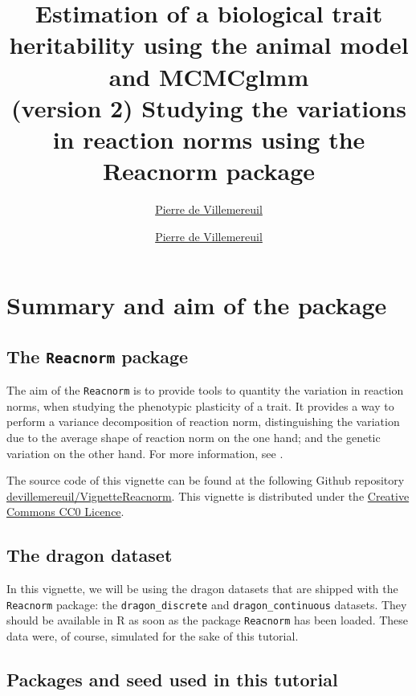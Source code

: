 \documentclass[a4paper,12pt,twoside]{article}
\title{
  \tcbox[colback=themecolor,colframe=themecolor]{\color{white}Tutorial} 
  Estimation of a biological trait heritability using the animal model and MCMCglmm\\
  \large{(version 2)}
}
\author[Pierre de Villemereuil]{\href{mailto:pierre.de-villemereuil@mnhn.fr}{Pierre de Villemereuil}}
\author{\href{mailto:pierre.de-villemereuil@mnhn.fr}{Pierre de Villemereuil}}
\title{Studying the variations in reaction norms using the Reacnorm package}
\begin{document}
\maketitle

\tableofcontents

\newpage

\section{Summary and aim of the package}

\subsection{The \texttt{Reacnorm} package}

The aim of the \texttt{Reacnorm} is to provide tools to quantity the variation in reaction norms, when studying the phenotypic plasticity of a trait. It provides a way to perform a variance decomposition of reaction norm, distinguishing the variation due to the average shape of reaction norm on the one hand; and the genetic variation on the other hand. For more information, see \textcite{devillemereuil_partitioning_2025}.

The source code of this vignette can be found at the following Github repository \href{https://github.com/devillemereuil/VignetteReacnorm}{devillemereuil/VignetteReacnorm}. This vignette is distributed under the \href{https://creativecommons.org/publicdomain/zero/1.0/deed.en}{Creative Commons CC0 Licence}.

\subsection{The dragon dataset}

In this vignette, we will be using the dragon datasets that are shipped with the \texttt{Reacnorm} package: the \texttt{dragon\_discrete} and \texttt{dragon\_continuous} datasets. They should be available in R as soon as the package \texttt{Reacnorm} has been loaded.
These data were, of course, simulated for the sake of this tutorial.

\subsection{Packages and seed used in this tutorial}
\end{document}
